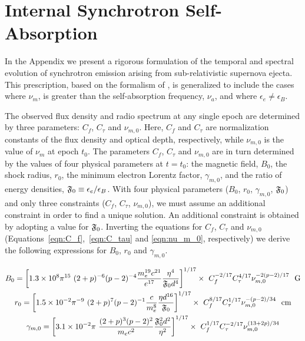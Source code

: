 \documentclass[12pt,preprint]{aastex}
\begin{document}
\section{Internal Synchrotron Self-Absorption}
\label{sec:ssa}

In the Appendix we present a rigorous formulation of the temporal and
spectral evolution of synchrotron emission arising from
sub-relativistic supernova ejecta. This prescription, based on the
formalism of \citet{fwk00}, is generalized to include the cases where
$\nu_m$, is greater than the self-absorption frequency, $\nu_a$, and
where $\epsilon_e \neq \epsilon_B$.

The observed flux density and radio spectrum at any single epoch are
determined by three parameters: $C_f$, $C_{\tau}$ and $\nu_{m,0}$.
Here, $C_f$ and $C_{\tau}$ are normalization constants of the flux
density and optical depth, respectively, while $\nu_{m,0}$ is the
value of $\nu_m$ at epoch $t_0$.  The parameters $C_f$, $C_{\tau}$ and
$\nu_{m,0}$ are in turn determined by the values of four physical
parameters at $t=t_0$: the magnetic field, $B_0$, the shock radius,
$r_0$, the minimum electron Lorentz factor, $\gamma_{m,0}$, and the
ratio of energy densities, $\frak{F}_0\equiv\epsilon_e/\epsilon_B$.
With four physical parameters ($B_0$, $r_0$, $\gamma_{m,0}$,
$\frak{F}_0$) and only three constraints ($C_f$, $C_{\tau}$,
$\nu_{m,0}$), we must assume an additional constraint in order to find
a unique solution.  An additional constraint is obtained by
adopting a value for $\frak{F}_0$. Inverting the equations for $C_f$,
$C_{\tau}$ and $\nu_{m,0}$ (Equations~\ref{eqn:C_f},~\ref{eqn:C_tau}
and \ref{eqn:nu_m_0}, respectively) we derive the following
expressions for $B_0$, $r_0$ and $\gamma_{m,0}$.

\begin{gather}
B_0=\left[1.3\times 10^8 \pi^{15} ~(2+p)^{-6}(p-2)^{-4} \frac{m_e^{19} c^{21}}{e^{17}} \frac{\eta^4}{\frak{F}_0 d^4}\right]^{1/17} \times ~C_f^{-2/17} C_{\tau}^{4/17} \nu_{m,0}^{-2(p-2)/17}~~\rm G
\label{eqn:B_0} \\
r_0=\left[1.5\times 10^{-2} \pi^{-9} ~(2+p)^7 (p-2)^{-1}  \frac{c}{m_e^8} \frac{\eta d^{16}}{\frak{F}_0}\right]^{1/17} \times ~C_f^{8/17} C_{\tau}^{1/17} \nu_{m,0}^{-(p-2)/34}~~\rm cm
\label{eqn:r_0}\\
\gamma_{m,0}=\left[3.1\times 10^{-2} \pi~\frac{(2+p)^3 (p-2)^2}{m_e c^2} \frac{\frak{F}_0^2 d^2}{\eta^2}\right]^{1/17} \times ~C_f^{1/17} C_{\tau}^{-2/17} \nu_{m,0}^{(13+2p)/34}
\label{eqn:gamma_m_0}
\end{gather}
\end{document}
